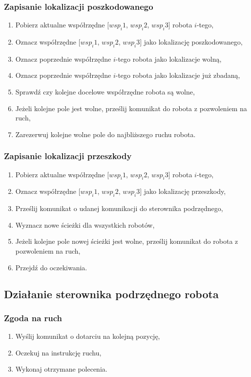 \subsubsection*{Zapisanie lokalizacji poszkodowanego}
\begin{enumerate}
    \item Pobierz aktualne współrzędne $[wsp_i1$, $wsp_i2$, $wsp_i3]$ robota $i$-tego,
    \item Oznacz współrzędne $[wsp_i1$, $wsp_i2$, $wsp_i3]$ jako lokalizację poszkodowanego,
    \item Oznacz poprzednie współrzędne $i$-tego robota jako lokalizacje wolną,
    \item Oznacz poprzednie współrzędne $i$-tego robota jako lokalizacje już zbadaną,
    \item Sprawdź czy kolejne docelowe współrzędne robota są wolne,
    \item Jeżeli kolejne pole jest wolne, prześlij komunikat do robota z pozwoleniem na ruch,
    \item Zarezerwuj kolejne wolne pole do najbliższego ruchu robota. %


\end{enumerate}

\subsubsection*{Zapisanie lokalizacji przeszkody}
\begin{enumerate}
    \item Pobierz aktualne współrzędne $[wsp_i1$, $wsp_i2$, $wsp_i3]$ robota $i$-tego,
    \item Oznacz współrzędne $[wsp_i1$, $wsp_i2$, $wsp_i3]$ jako lokalizację przeszkody,
    \item Prześlij komunikat o udanej komunikacji do sterownika podrzędnego,
    \item Wyznacz nowe ścieżki dla wszystkich robotów,
    \item Jeżeli kolejne pole nowej ścieżki jest wolne, prześlij komunikat do robota z pozwoleniem na ruch,
    \item Przejdź do oczekiwania.
\end{enumerate}

\subsection{Działanie sterownika podrzędnego robota}
\subsubsection*{Zgoda na ruch}
\begin{enumerate}
    \item Wyślij komunikat o dotarciu na kolejną pozycję,
    \item Oczekuj na instrukcję ruchu,
    \item Wykonaj otrzymane polecenia.
\end{enumerate}